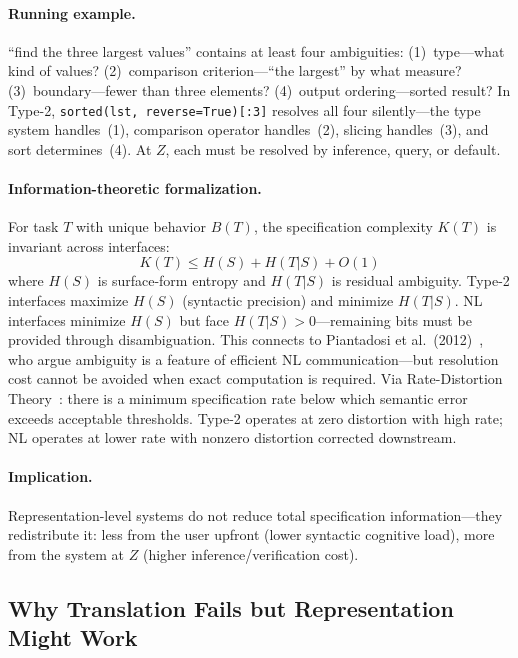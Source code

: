 \documentclass[11pt]{article}
\theoremstyle{definition}
\begin{document}
\paragraph{Running example.}
``find the three largest values'' contains at least four ambiguities: (1)~type---what kind of values? (2)~comparison criterion---``the largest'' by what measure? (3)~boundary---fewer than three elements? (4)~output ordering---sorted result? In Type-2, \texttt{sorted(lst, reverse=True)[:3]} resolves all four silently---the type system handles~(1), comparison operator handles~(2), slicing handles~(3), and sort determines~(4). At $Z$, each must be resolved by inference, query, or default.

\paragraph{Information-theoretic formalization.}
For task $T$ with unique behavior $B(T)$, the specification complexity $K(T)$ is invariant across interfaces:
\begin{equation}\label{eq:conservation}
K(T) \leq H(S) + H(T|S) + O(1)
\end{equation}
where $H(S)$ is surface-form entropy and $H(T|S)$ is residual ambiguity. Type-2 interfaces maximize $H(S)$ (syntactic precision) and minimize $H(T|S)$. NL interfaces minimize $H(S)$ but face $H(T|S) > 0$---remaining bits must be provided through disambiguation. This connects to Piantadosi et al.\ (2012)~\cite{piantadosi2012ambiguity}, who argue ambiguity is a feature of efficient NL communication---but resolution cost cannot be avoided when exact computation is required. Via Rate-Distortion Theory~\cite{shannon1959coding}: there is a minimum specification rate below which semantic error exceeds acceptable thresholds. Type-2 operates at zero distortion with high rate; NL operates at lower rate with nonzero distortion corrected downstream.

\paragraph{Implication.}
Representation-level systems do not reduce total specification information---they redistribute it: less from the user upfront (lower syntactic cognitive load), more from the system at $Z$ (higher inference/verification cost).

\subsection{Why Translation Fails but Representation Might Work}
\end{document}
